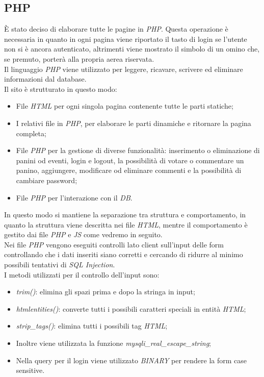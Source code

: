 \subsection{PHP}
È stato deciso di elaborare tutte le pagine in \emph{PHP}. 
Questa operazione è necessaria in quanto in ogni pagina viene riportato il tasto di login se l'utente non si è ancora autenticato, altrimenti viene mostrato il simbolo di un omino che, se premuto, porterà alla propria aerea riservata.\\
Il linguaggio \emph{PHP} viene utilizzato per leggere, ricavare, scrivere ed eliminare informazioni dal database.\\
Il sito è strutturato in questo modo: 
\begin{itemize}
    \item File \emph{HTML} per ogni singola pagina contenente tutte le parti statiche;
    \item I relativi file in \emph{PHP}, per elaborare le parti dinamiche e ritornare la pagina completa;
    \item File \emph{PHP} per la gestione di diverse funzionalità: inserimento o eliminazione di panini od eventi, login e logout, la possibilità di votare o commentare un panino, aggiungere, modificare od eliminare commenti e la possibilità di cambiare password;
    \item File \emph{PHP} per l'interazione con il \emph{DB}.
\end{itemize}
In questo modo si mantiene la separazione tra struttura e comportamento, in quanto la struttura viene descritta nei file \emph{HTML}, mentre il comportamento è gestito dai file \emph{PHP} e \emph{JS} come vedremo in seguito.\\

Nei file \emph{PHP} vengono eseguiti controlli lato client sull'input delle form controllando che i dati inseriti siano corretti e cercando di ridurre al minimo possibili tentativi di \emph{SQL Injection}.\\
I metodi utilizzati per il controllo dell'input sono: 
    \begin{itemize}
        \item \emph{trim()}: elimina gli spazi prima e dopo la stringa in input;
        \item \emph{htmlentities()}: converte tutti i possibili caratteri speciali in entità \emph{HTML};
        \item \emph{strip\_tags()}: elimina tutti i possibili tag \emph{HTML};
        \item Inoltre viene utilizzata la funzione \emph{mysqli\_real\_escape\_string};
        \item Nella query per il login viene utilizzato \emph{BINARY} per rendere la form case sensitive.
    \end{itemize}